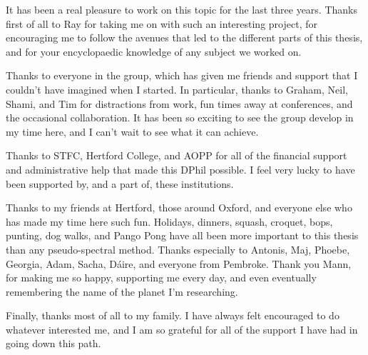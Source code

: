 \begin{acknowledgements}
\OnehalfSpacing

\noindent

It has been a real pleasure to work on this topic for the last three years. Thanks first of all to Ray for taking me on with such an interesting project, for encouraging me to follow the avenues that led to the different parts of this thesis, and for your encyclopaedic knowledge of any subject we worked on.

Thanks to everyone in the group, which has given me friends and support that I couldn't have imagined when I started. In particular, thanks to Graham, Neil, Shami, and Tim for distractions from work, fun times away at conferences, and the occasional collaboration. It has been so exciting to see the group develop in my time here, and I can't wait to see what it can achieve.

Thanks to STFC, Hertford College, and AOPP for all of the financial support and administrative help that made this DPhil possible. I feel very lucky to have been supported by, and a part of, these institutions.

Thanks to my friends at Hertford, those around Oxford, and everyone else who has made my time here such fun. Holidays, dinners, squash, croquet, bops, punting, dog walks, and Pango Pong have all been more important to this thesis than any pseudo-spectral method. Thanks especially to Antonis, Maj, Phoebe, Georgia, Adam, Sacha, Dáire, and everyone from Pembroke. Thank you Mann, for making me so happy, supporting me every day, and even eventually remembering the name of the planet I'm researching.

Finally, thanks most of all to my family. I have always felt encouraged to do whatever interested me, and I am so grateful for all of the support I have had in going down this path.

\DoubleSpacing


%
%
%
%
%



\end{acknowledgements}
